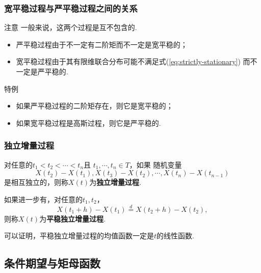 \begin{frame}
    \frametitle{宽平稳过程与严平稳过程之间的关系}
    \begin{alertblock}{注意}
        一般来说，这两个过程是互不包含的.

        \begin{itemize}
            \item 严平稳过程由于不一定有二阶矩而不一定是宽平稳的；
            \item 宽平稳过程由于其有限维联合分布可能不满足式(\ref{eq:strictly-stationary})
                    而不一定是严平稳的. 
        \end{itemize}
        
        
    \end{alertblock}
    \begin{exampleblock}{特例}
        \begin{itemize}
            \item 如果严平稳过程的二阶矩存在，则它是宽平稳的；
            \item 如果宽平稳过程是高斯过程，则它是严平稳的. 
        \end{itemize}
    \end{exampleblock}
\end{frame}

\begin{frame}
    \frametitle{独立增量过程}
    \begin{mydefinition}[独立增量过程与平稳独立增量过程]\label{def:independent-increment-process}
        对任意的$t_1<t_2<\cdots<t_n$且
        $t_1,\cdots,t_n\in T$，如果
        随机变量
        $$
            X(t_2)-X(t_1),X(t_3)-X(t_2),\cdots,X(t_n)-X(t_{n-1})
        $$
        是相互独立的，则称$X(t)$为\textbf{独立增量过程}.
        
        如果进一步有，对任意的$t_1,t_2$，
        \begin{equation*}
            X(t_1+h)-X(t_1)\overset{d}{=}X(t_2+h)-X(t_2),
        \end{equation*}
        则称$X(t)$为\textbf{平稳独立增量过程}. 
    \end{mydefinition}
    \begin{myproposition}
        可以证明，平稳独立增量过程的均值函数一定是$t$的线性函数. 
    \end{myproposition}
\end{frame}

\subsection{条件期望与矩母函数}

